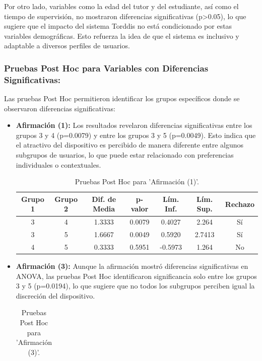 				Por otro lado, variables como la edad del tutor y del estudiante, así como el tiempo de supervisión, no mostraron diferencias significativas (p>0.05), lo que sugiere que el impacto del sistema Torddis no está condicionado por estas variables demográficas. Esto refuerza la idea de que el sistema es inclusivo y adaptable a diversos perfiles de usuarios.
			
			\subsubsection{Pruebas Post Hoc para Variables con Diferencias Significativas:}
				Las pruebas Post Hoc permitieron identificar los grupos específicos donde se observaron diferencias significativas:
				
				\begin{itemize}
				\item \textbf{Afirmación (1):} Los resultados revelaron diferencias significativas entre los grupos 3 y 4 (p=0.0079) y entre los grupos 3 y 5 (p=0.0049). Esto indica que el atractivo del dispositivo es percibido de manera diferente entre algunos subgrupos de usuarios, lo que puede estar relacionado con preferencias individuales o contextuales.
				\begin{table}[ht]
					\centering
					\caption{Pruebas Post Hoc para 'Afirmación (1)'.}
					\begin{tabularx}{0.75\textwidth}{ccccccc}
						\hline
						\textbf{Grupo 1} & \textbf{Grupo 2} & \textbf{Dif. de Media} & \textbf{p-valor} & \textbf{Lím. Inf.} & \textbf{Lím. Sup.} & \textbf{Rechazo} \\
						\hline
						3 & 4 & 1.3333 & 0.0079 & 0.4027 & 2.264 & Sí \\
						3 & 5 & 1.6667 & 0.0049 & 0.5920 & 2.7413 & Sí \\
						4 & 5 & 0.3333 & 0.5951 & -0.5973 & 1.264 & No \\
						\hline
					\end{tabularx}
					\label{table:posthoc_1}
				\end{table}
				\item \textbf{Afirmación (3):} Aunque la afirmación mostró diferencias significativas en ANOVA, las pruebas Post Hoc identificaron significancia solo entre los grupos 3 y 5 (p=0.0194), lo que sugiere que no todos los subgrupos perciben igual la discreción del dispositivo.
				\begin{table}[ht]
					\centering
					\caption{Pruebas Post Hoc para 'Afirmación (3)'.}
					\begin{tabularx}{0.75\textwidth}{ccccccc}

\end{tabularx}
\end{table}
\end{itemize}
